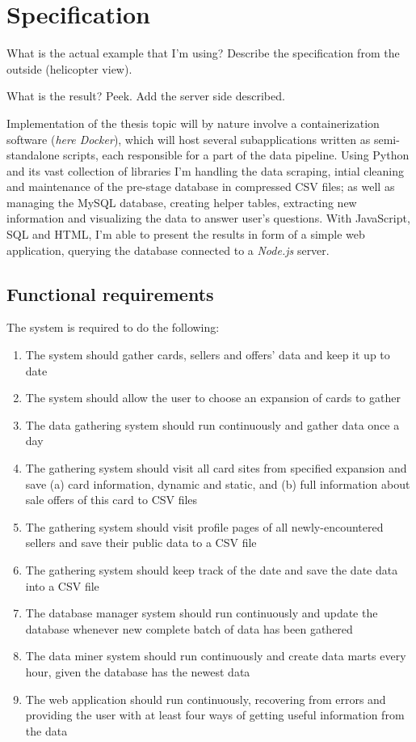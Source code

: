 \chapter{Specification}
\label{ch:specification}
What is the actual example that I'm using? Describe the specification from the outside (helicopter view).

What is the result? Peek.
Add the server side described.

Implementation of the thesis topic will by nature involve a containerization software (\textit{here Docker}), which will host several subapplications written as semi-standalone scripts, each responsible for a part of the data pipeline. Using Python and its vast collection of libraries I'm handling the data scraping, intial cleaning and maintenance of the pre-stage database in compressed CSV files; as well as managing the MySQL database, creating helper tables, extracting new information and visualizing the data to answer user's questions. With JavaScript, SQL and HTML, I'm able to present the results in form of a simple web application, querying the database connected to a \textit{Node.js} server.


\section{Functional requirements}
The system is required to do the following:
\begin{enumerate}
\item The system should gather cards, sellers and offers' data and keep it up to date
\item The system should allow the user to choose an expansion of cards to gather
\item The data gathering system should run continuously and gather data once a day
\item The gathering system should visit all card sites from specified expansion and save (a) card information, dynamic and static, and (b) full information about sale offers of this card to CSV files
\item The gathering system should visit profile pages of all newly-encountered sellers and save their public data to a CSV file
\item The gathering system should keep track of the date and save the date data into a CSV file
\item The database manager system should run continuously and update the database whenever new complete batch of data has been gathered
\item The data miner system should run continuously and create data marts every hour, given the database has the newest data
\item The web application should run continuously, recovering from errors and providing the user with at least four ways of getting useful information from the data
\end{enumerate}


